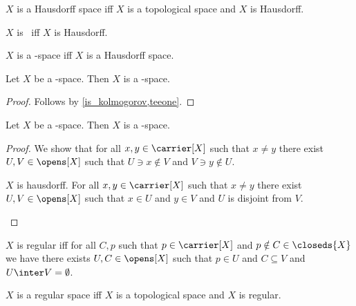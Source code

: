 \begin{abbreviation}\label{hausdorff_space}
    $X$ is a Hausdorff space iff $X$ is a topological space and
    $X$ is Hausdorff.
\end{abbreviation}

\begin{abbreviation}\label{teetwo}
    $X$ is \teetwo\ iff $X$ is Hausdorff.
\end{abbreviation}

\begin{abbreviation}\label{teetwo_space}
    $X$ is a \teetwo-space iff $X$ is a Hausdorff space.
\end{abbreviation}

\begin{proposition}\label{teeone_space_is_teezero_space}
    Let $X$ be a \teeone-space.
    Then $X$ is a \teezero-space.
\end{proposition}
\begin{proof}
    Follows by \cref{is_kolmogorov,teeone}.
\end{proof}

\begin{proposition}\label{teetwo_space_is_teeone_space}
    Let $X$ be a \teetwo-space.
    Then $X$ is a \teeone-space.
\end{proposition}
\begin{proof}
    We show that for all $x,y\in\carrier[X]$ such that $x\neq y$
    there exist $U, V\in\opens[X]$ such that
    $U\ni x\notin V$ and $V\ni y\notin U$.
    \begin{subproof}
        $X$ is hausdorff.
        For all $x,y\in\carrier[X]$ such that $x\neq y$
        there exist $U, V\in\opens[X]$ such that
        $x\in U$ and $y\in V$ and $U$ is disjoint from $V$.
    \end{subproof}
\end{proof}

\begin{definition}\label{is_regular}
    $X$ is regular iff for all $C,p$ such that $p \in \carrier[X]$ and $p \notin C \in \closeds{X}$ we have there exists $U,C \in \opens[X]$ such that $p \in U$ and $C \subseteq V$ and $U \inter V = \emptyset$.
\end{definition}

\begin{abbreviation}\label{regular_space}
    $X$ is a regular space iff $X$ is a topological space and $X$ is regular.
\end{abbreviation}


